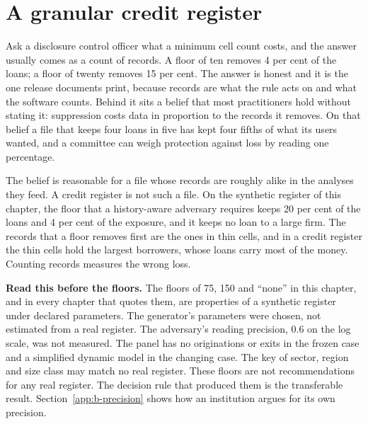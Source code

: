 \chapter{A granular credit register}\label{ch:credit}

Ask a disclosure control officer what a minimum cell count costs, and the answer
usually comes as a count of records. A floor of ten removes 4 per cent of the loans;
a floor of twenty removes 15 per cent.
The answer is honest and it is the one release documents print, because records are
what the rule acts on and what the software counts. Behind it sits a belief that
most practitioners hold without stating it: suppression costs data in proportion to
the records it removes. On that belief a file that keeps four loans in five has kept
four fifths of what its users wanted, and a committee can weigh protection against
loss by reading one percentage.

The belief is reasonable for a file whose records are roughly alike in the analyses
they feed. A credit register is not such a file. On the synthetic register of this
chapter, the floor that a history-aware adversary requires keeps 20 per cent of the
loans and 4 per cent of the exposure, and it keeps no loan to a large firm.
The records that a floor removes first are the ones in thin cells, and in a credit
register the thin cells hold the largest borrowers, whose loans carry most of the
money. Counting records measures the wrong loss.

\begin{mdframed}[linecolor=black,linewidth=0.8pt,backgroundcolor=gray!8,innerleftmargin=8pt,innerrightmargin=8pt]
\textbf{Read this before the floors.} The floors of 75, 150 and ``none'' in this chapter, and
in every chapter that quotes them, are properties of a synthetic register under declared
parameters. The generator's parameters were chosen, not estimated from a real register. The
adversary's reading precision, 0.6 on the log scale, was not measured. The panel has no
originations or exits in the frozen case and a simplified dynamic model in the changing
case. The key of sector, region and size class may match no real register. These floors are
not recommendations for any real register. The decision rule that produced them is the
transferable result. Section~\ref{app:b-precision} shows how an institution argues for its
own precision.
\end{mdframed}


